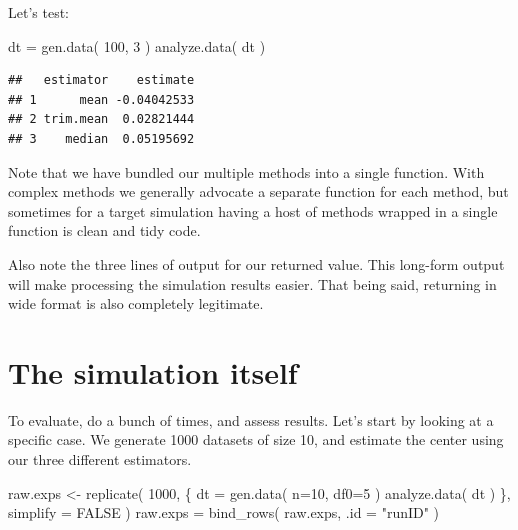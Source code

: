 \documentclass[
]{book}
\newenvironment{Shaded}{\begin{snugshade}}{\end{snugshade}}
\newcommand{\AttributeTok}[1]{\textcolor[rgb]{0.77,0.63,0.00}{#1}}
\newcommand{\ConstantTok}[1]{\textcolor[rgb]{0.00,0.00,0.00}{#1}}
\newcommand{\DecValTok}[1]{\textcolor[rgb]{0.00,0.00,0.81}{#1}}
\newcommand{\FunctionTok}[1]{\textcolor[rgb]{0.00,0.00,0.00}{#1}}
\newcommand{\NormalTok}[1]{#1}
\newcommand{\OtherTok}[1]{\textcolor[rgb]{0.56,0.35,0.01}{#1}}
\newcommand{\StringTok}[1]{\textcolor[rgb]{0.31,0.60,0.02}{#1}}
\begin{document}
Let's test:

\begin{Shaded}
\begin{Highlighting}[]
\NormalTok{dt }\OtherTok{=} \FunctionTok{gen.data}\NormalTok{( }\DecValTok{100}\NormalTok{, }\DecValTok{3}\NormalTok{ )}
\FunctionTok{analyze.data}\NormalTok{( dt )}
\end{Highlighting}
\end{Shaded}

\begin{verbatim}
##   estimator    estimate
## 1      mean -0.04042533
## 2 trim.mean  0.02821444
## 3    median  0.05195692
\end{verbatim}

Note that we have bundled our multiple methods into a single function.
With complex methods we generally advocate a separate function for each method, but sometimes for a target simulation having a host of methods wrapped in a single function is clean and tidy code.

Also note the three lines of output for our returned value.
This long-form output will make processing the simulation results easier.
That being said, returning in wide format is also completely legitimate.

\hypertarget{the-simulation-itself}{%
\section{The simulation itself}\label{the-simulation-itself}}

To evaluate, do a bunch of times, and assess results. Let's start by looking
at a specific case. We generate 1000 datasets of size 10, and estimate the
center using our three different estimators.

\begin{Shaded}
\begin{Highlighting}[]
\NormalTok{raw.exps }\OtherTok{\textless{}{-}} \FunctionTok{replicate}\NormalTok{( }\DecValTok{1000}\NormalTok{, \{}
\NormalTok{    dt }\OtherTok{=} \FunctionTok{gen.data}\NormalTok{( }\AttributeTok{n=}\DecValTok{10}\NormalTok{, }\AttributeTok{df0=}\DecValTok{5}\NormalTok{ )}
    \FunctionTok{analyze.data}\NormalTok{( dt )}
\NormalTok{\}, }\AttributeTok{simplify =} \ConstantTok{FALSE}\NormalTok{ )}
\NormalTok{raw.exps }\OtherTok{=} \FunctionTok{bind\_rows}\NormalTok{( raw.exps, }\AttributeTok{.id =} \StringTok{"runID"}\NormalTok{ )}
\end{Highlighting}
\end{Shaded}
\end{document}
